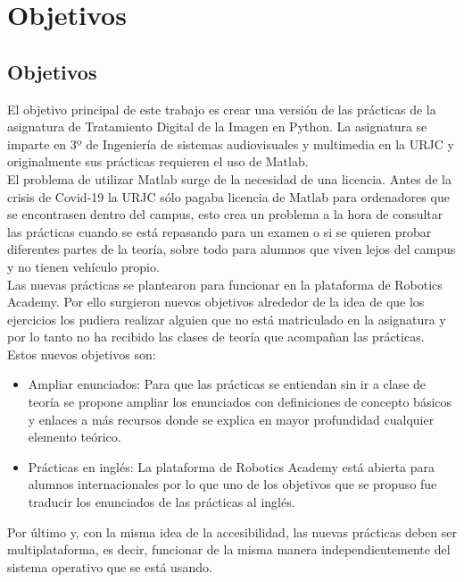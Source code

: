 \chapter{Objetivos}

\section{Objetivos}

El objetivo principal de este trabajo es crear una versión de las prácticas de la asignatura de Tratamiento Digital de la Imagen en Python. La asignatura se imparte en 3º de Ingeniería de sistemas audiovisuales y multimedia en la URJC y originalmente sus prácticas requieren el uso de Matlab. \\

El problema de utilizar Matlab surge de la necesidad de una licencia. Antes de la crisis de Covid-19 la URJC sólo pagaba licencia de Matlab para ordenadores que se encontrasen dentro del campus, esto crea un problema a la hora de consultar las prácticas cuando se está repasando para un examen o si se quieren probar diferentes partes de la teoría, sobre todo para alumnos que viven lejos del campus y no tienen vehículo propio.\\

Las nuevas prácticas se plantearon para funcionar en la plataforma de Robotics Academy. Por ello surgieron nuevos objetivos alrededor de la idea de que los ejercicios los pudiera realizar alguien que no está matriculado en la asignatura y por lo tanto no ha recibido las clases de teoría que acompañan las prácticas. Estos nuevos objetivos son:
\begin{itemize}
    \item Ampliar enunciados: Para que las prácticas se entiendan sin ir a clase de teoría se propone ampliar los enunciados con definiciones de concepto básicos y enlaces a más recursos donde se explica en mayor profundidad cualquier elemento teórico.
    \item Prácticas en inglés: La plataforma de Robotics Academy está abierta para alumnos internacionales por lo que uno de los objetivos que se propuso fue traducir los enunciados de las prácticas al inglés.
\end{itemize}

Por último y, con la misma idea de la accesibilidad, las nuevas prácticas deben ser multiplataforma, es decir, funcionar de la misma manera independientemente del sistema operativo que se está usando.

